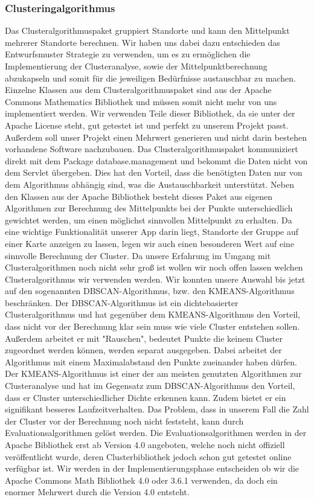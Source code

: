 	\subsubsection{Clusteringalgorithmus}

Das Clusteralgorithmuspaket gruppiert Standorte und kann den Mittelpunkt mehrerer Standorte berechnen. Wir haben uns dabei dazu entschieden das Entwurfsmuster Strategie zu verwenden, um es zu ermöglichen die Implementierung der Clusteranalyse, sowie der Mittelpunktberechnung abzukapseln und somit für die jeweiligen Bedürfnisse austauschbar zu machen. Einzelne Klassen aus dem Clusteralgorithmuspaket sind aus der Apache Commons Mathematics Bibliothek und müssen somit nicht mehr von uns implementiert werden. Wir verwenden Teile dieser Bibliothek, da sie unter der Apache License steht, gut getestet ist und perfekt zu unserem Projekt passt. Außerdem soll unser Projekt einen Mehrwert generieren und nicht darin bestehen vorhandene Software nachzubauen. Das Clusteralgorithmuspaket kommuniziert direkt mit dem Package database.management und bekommt die Daten nicht von dem Servlet übergeben. Dies hat den Vorteil, dass die benötigten Daten nur von dem Algorithmus abhängig sind, was die Austauschbarkeit unterstützt. Neben den Klassen aus der Apache Bibliothek besteht dieses Paket aus eigenen Algorithmen zur Berechnung des Mittelpunkts bei der Punkte unterschiedlich gewichtet werden, um einen möglichst sinnvollen Mittelpunkt zu erhalten. Da eine wichtige Funktionalität unserer App darin liegt, Standorte der Gruppe auf einer Karte anzeigen zu lassen, legen wir auch einen besonderen Wert auf eine sinnvolle Berechnung der Cluster. Da unsere Erfahrung im Umgang mit Clusteralgorithmen noch nicht sehr groß ist wollen wir noch offen lassen welchen Clusteralgorithmus wir verwenden werden. Wir konnten unsere Auswahl bis jetzt auf den sogenannten DBSCAN-Algorithmus, bzw. den KMEANS-Algorithmus beschränken. Der DBSCAN-Algorithmus ist ein dichtebasierter Clusteralgorithmus und hat gegenüber dem KMEANS-Algorithmus den Vorteil, dass nicht vor der Berechnung klar sein muss wie viele Cluster entstehen sollen. Außerdem arbeitet er mit "Rauschen", bedeutet Punkte die keinem Cluster zugeordnet werden können, werden separat ausgegeben. Dabei arbeitet der Algorithmus mit einem Maximalabstand den Punkte zueinander haben dürfen. 
Der KMEANS-Algorithmus ist einer der am meisten genutzten Algorithmen zur Clusteranalyse und hat im Gegensatz zum DBSCAN-Algorithmus den Vorteil, dass er Cluster unterschiedlicher Dichte erkennen kann. Zudem bietet er ein signifikant besseres Laufzeitverhalten. Das Problem, dass in unserem Fall die Zahl der Cluster vor der Berechnung noch nicht feststeht, kann durch Evaluationsalgorithmen gelöst werden. Die Evaluationsalgorithmen werden in der Apache Bibliothek erst ab Version 4.0 angeboten, welche noch nicht offiziell veröffentlicht wurde, deren Clusterbibliothek jedoch schon gut getestet online verfügbar ist.
Wir werden in der Implementierungsphase entscheiden ob wir die Apache Commons Math Bibliothek 4.0 oder 3.6.1 verwenden, da doch ein enormer Mehrwert durch die Version 4.0 entsteht.
  \newline
 
